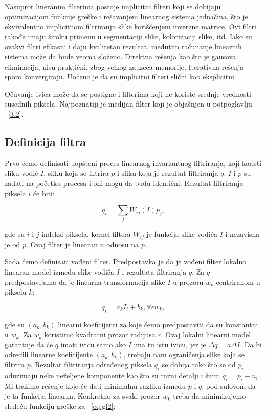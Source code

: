 \documentclass[a4paper,12pt,titlepage]{article}
\begin{document}
Nasuprot lineranim filterima postoje implicitni filteri koji se dobijaju optimizacijom funkcije greške i rešavanjem linearnog sistema jednačina, što je ekvivalentno implicitnom filtriranju slike korišćenjem inverzne matrice. Ovi filtri takođe imaju široku primenu u segmentaciji slike, kolorizaciji slike, itd. Iako su ovakvi filtri efikasni i daju kvalitetan rezultat, međutim računanje linearnih sistema može da bude veoma složeno. Direktna rešenja kao što je gausova eliminacija, nisu praktični, zbog velkog zauzeća memorije. Iterativna rešenja sporo konvergiraju. Uočeno je da su implicitni filteri slični kao eksplicitni. 

Očuvanje ivica može da se postigne i filterima koji ne koriste srednje vrednosti susednih piksela. Najpoznatiji je medijan filter koji je objašnjen u potpoglavlju ~\ref{3.2}.           

\subsection{Definicija filtra}\label{4.3}%

Prvo ćemo definisati uopšteni proces linearnog invariantnog filtriranja, koji koristi sliku vodič $I$, sliku koja se filtrira $p$ i sliku koja je rezultat filtriranja $q$. $I$ i $p$ su zadati na početku procesa i oni mogu da budu identični. Rezultat filtriranja piksela $i$ će biti: 

\begin{equation}\label{eq:gf1}
	q_i = \sum_{j} W_{ij}(I)p_j,
\end{equation}

gde su $i$ i $j$ indeksi piksela, kernel filtera $W_{ij}$ je funkcija slike vodiča $I$ i nezavisna je od $p$. Ovaj filter je linearan u odnosu na $p$. 

Sada ćemo definisati vođeni filter. Predpostavka je da je vođeni filter lokalno linearan model između slike vodiča $I$ i rezultata filtriranja $q$. Za $q$ predpostavljamo da je linearna transformacija slike $I$ u prozoru $w_k$ centriranom u pikselu $k$:

\begin{equation}\label{eq:gf2}
	q_i = a_kI_i + b_k, \forall \epsilon w_k,
\end{equation}

gde su $(a_k, b_k)$ linearni koeficijenti za koje ćemo predpostaviti da su konstantni u $w_k$. Za $w_k$ koristimo kvadratni prozor radijusa $r$. Ovaj lokalni linearni model garantuje da će $q$ imati ivicu samo ako $I$ ima tu istu ivicu, jer je $\Delta q = a\Delta I$. Da bi odredili linearne koeficijente $(a_k, b_k)$, trebaju nam ograničenja slike koja se filtrira $p$. Rezultat filtriranja određenog piksela $q_i$ se dobija tako što se od $p_i$ oduzimaju neke neželjene komponente kao što su razni detalji i šum: $q_i = p_i - n_i$. Mi tražimo rešenje koje će dati minimalnu razliku između $p$ i $q$, pod sulovom da je ta funkcija linearna. Konkretno za svaki prozor $w_k$ treba da minimizujemo sledeću funkciju greške za ~\ref{eq:gf2}:
\end{document}
